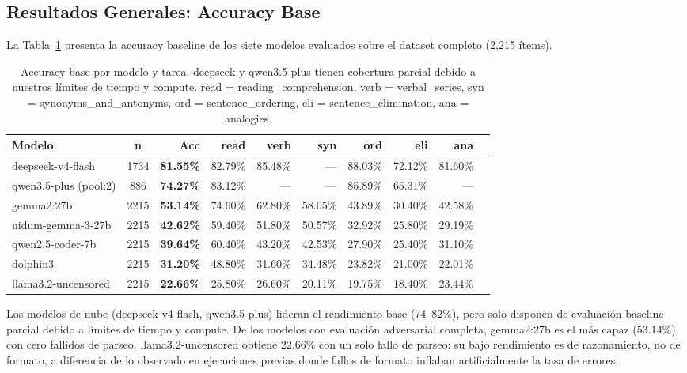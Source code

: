 \documentclass[11pt]{article}
\begin{document}
\subsection{Resultados Generales: Accuracy Base}
 
La Tabla~\ref{tab:baseline} presenta la accuracy baseline de los siete
modelos evaluados sobre el dataset completo (2{,}215 ítems).
 
\begin{table}[t]
  \centering\small
  \begin{tabular}{lcrrrrrrrr}
    \toprule
    \textbf{Modelo} & \textbf{n} &
    \textbf{Acc} &
    \textbf{read} & \textbf{verb} & \textbf{syn} &
    \textbf{ord} & \textbf{eli} & \textbf{ana} \\
    \midrule
    deepseek-v4-flash     & 1734 & \textbf{81.55\%} & 82.79\% & 85.48\% & — & 88.03\% & 72.12\% & 81.60\% \\
    qwen3.5-plus (pool:2) & 886  & \textbf{74.27\%} & 83.12\% & — & — & 85.89\% & 65.31\% & — \\
    gemma2:27b            & 2215 & \textbf{53.14\%} & 74.60\% & 62.80\% & 58.05\% & 43.89\% & 30.40\% & 42.58\% \\
    nidum-gemma-3-27b     & 2215 & \textbf{42.62\%} & 59.40\% & 51.80\% & 50.57\% & 32.92\% & 25.80\% & 29.19\% \\
    qwen2.5-coder-7b      & 2215 & \textbf{39.64\%} & 60.40\% & 43.20\% & 42.53\% & 27.90\% & 25.40\% & 31.10\% \\
    dolphin3              & 2215 & \textbf{31.20\%} & 48.80\% & 31.60\% & 34.48\% & 23.82\% & 21.00\% & 22.01\% \\
    llama3.2-uncensored   & 2215 & \textbf{22.66\%} & 25.80\% & 26.60\% & 20.11\% & 19.75\% & 18.40\% & 23.44\% \\
    \bottomrule
  \end{tabular}
  \caption{Accuracy base por modelo y tarea. deepseek y qwen3.5-plus tienen cobertura
  parcial debido a nuestros límites de tiempo y compute. read = reading\_comprehension,
  verb = verbal\_series, syn = synonyms\_and\_antonyms,
  ord = sentence\_ordering, eli = sentence\_elimination, ana = analogies.}
  \label{tab:baseline}
\end{table}
 
Los modelos de nube (deepseek-v4-flash, qwen3.5-plus) lideran el
rendimiento base (74--82\%), pero solo disponen de evaluación baseline
parcial debido a límites de tiempo y compute. De los modelos con
evaluación adversarial completa, gemma2:27b es el
más capaz (53.14\%) con cero fallidos de parseo. llama3.2-uncensored
obtiene 22.66\% con un solo fallo de parseo: su
bajo rendimiento es de razonamiento, no de formato, a diferencia de
lo observado en ejecuciones previas donde fallos de formato inflaban
artificialmente la tasa de errores.
 
\end{document}

